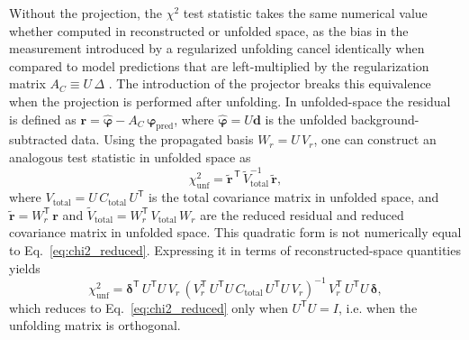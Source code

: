 \documentclass[a4paper,11pt]{article}
\begin{document}
Without the projection, the $\chi^2$ test statistic takes the same numerical value whether computed in reconstructed or unfolded space, as the bias in the measurement introduced by a regularized unfolding cancel identically when compared to model predictions that are left-multiplied by the regularization matrix $A_{C} \equiv U \, \Delta$ \cite{Tang:2017rob}. The introduction of the projector breaks this equivalence when the projection is performed after unfolding. In unfolded-space the residual is defined as $\mathbf{r} = \hat{\boldsymbol{\varphi}} - A_{C} \, \boldsymbol{\varphi}_{\text{pred}}$, where $\hat{\boldsymbol{\varphi}} = U \mathbf{d}$ is the unfolded background-subtracted data. Using the propagated basis $W_r = U \, V_r$, one can construct an analogous test statistic in unfolded space as
\begin{equation}\label{eq:chi2_proj_unfd}
    \chi^2_{\text{unf}} = \tilde{\mathbf{r}}^{\,\mathsf{T}} \, \tilde{V}_{\text{total}}^{-1} \, \tilde{\mathbf{r}},
\end{equation}
where $V_{\text{total}} = U \, C_{\text{total}} \, U^{\mathsf{T}}$ is the total covariance matrix in unfolded space, and $\tilde{\mathbf{r}} = W_r^{\mathsf{T}} \, \mathbf{r}$ and $\tilde{V}_{\text{total}} = W_r^{\mathsf{T}} \, V_{\text{total}} \, W_r$ are the reduced residual and reduced covariance matrix in unfolded space. This quadratic form is not numerically equal to Eq.~\eqref{eq:chi2_reduced}. Expressing it in terms of reconstructed-space quantities yields
\begin{equation}\label{eq:chi2_unfd_expanded}
    \chi^2_{\text{unf}} = \boldsymbol{\delta}^{\mathsf{T}} \, U^{\mathsf{T}} U \, V_r \, ( V_r^{\mathsf{T}} \, U^{\mathsf{T}} U \, C_{\text{total}} \, U^{\mathsf{T}} U \, V_r )^{-1} \, V_r^{\mathsf{T}} \, U^{\mathsf{T}} U \, \boldsymbol{\delta},
\end{equation}
which reduces to Eq.~\eqref{eq:chi2_reduced} only when $U^{\mathsf{T}} U = I$, i.e. when the unfolding matrix is orthogonal.
\end{document}
